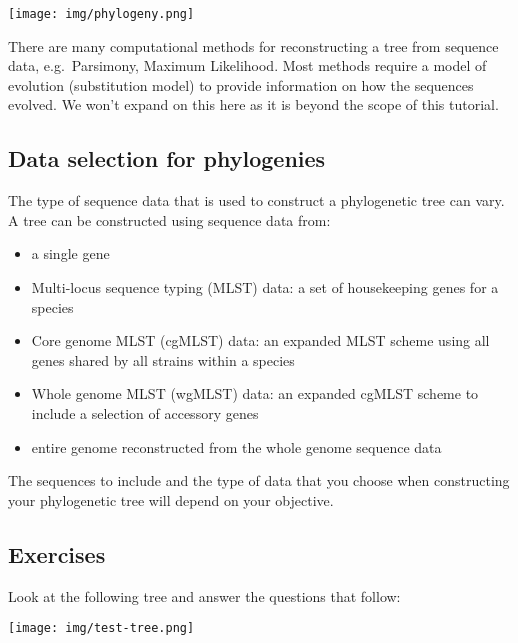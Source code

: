 \documentclass[11pt]{article}
\providecommand{\tightlist}{%
      \setlength{\itemsep}{0pt}\setlength{\parskip}{0pt}}
\begin{document}
\begin{center}
\texttt{[image: img/phylogeny.png]}
\end{center}


    There are many computational methods for reconstructing a tree from
sequence data, e.g.~Parsimony, Maximum Likelihood. Most methods require
a model of evolution (substitution model) to provide information on how
the sequences evolved. We won't expand on this here as it is beyond the
scope of this tutorial.

    \hypertarget{data-selection-for-phylogenies}{%
\subsection{Data selection for
phylogenies}\label{data-selection-for-phylogenies}}

The type of sequence data that is used to construct a phylogenetic tree
can vary. A tree can be constructed using sequence data from:

\begin{itemize}
\tightlist
\item
  a single gene
\item
  Multi-locus sequence typing (MLST) data: a set of housekeeping genes
  for a species
\item
  Core genome MLST (cgMLST) data: an expanded MLST scheme using all
  genes shared by all strains within a species
\item
  Whole genome MLST (wgMLST) data: an expanded cgMLST scheme to include
  a selection of accessory genes
\item
  entire genome reconstructed from the whole genome sequence data
\end{itemize}

The sequences to include and the type of data that you choose when
constructing your phylogenetic tree will depend on your objective.

    \hypertarget{exercises}{%
\subsection{Exercises}\label{exercises}}

Look at the following tree and answer the questions that follow:


\begin{center}
\texttt{[image: img/test-tree.png]}
\end{center}
\end{document}

